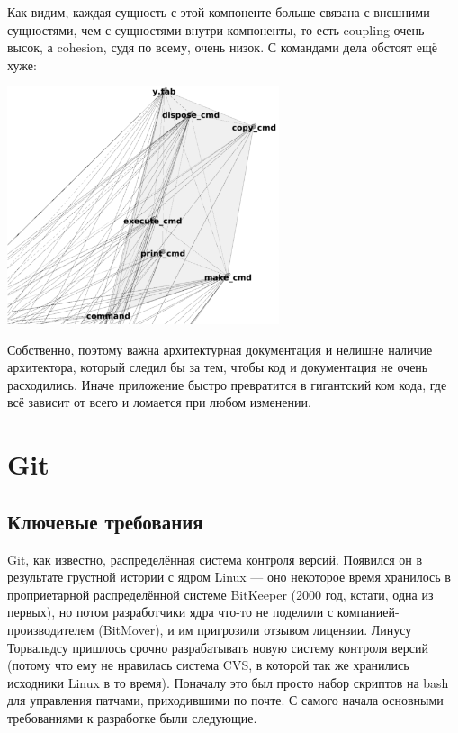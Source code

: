 \documentclass[a5paper]{article}
\begin{document}
Как видим, каждая сущность с этой компоненте больше связана с внешними сущностями, чем с сущностями внутри компоненты, то есть coupling очень высок, а cohesion, судя по всему, очень низок. С командами дела обстоят ещё хуже:

\begin{center}
    \includegraphics[width=0.6\textwidth]{bashCommands.png}
\end{center}

Собственно, поэтому важна архитектурная документация и нелишне наличие архитектора, который следил бы за тем, чтобы код и документация не очень расходились. Иначе приложение быстро превратится в гигантский ком кода, где всё зависит от всего и ломается при любом изменении.

\section{Git}

\subsection{Ключевые требования}

Git, как известно, распределённая система контроля версий. Появился он в результате грустной истории с ядром Linux --- оно некоторое время хранилось в проприетарной распределённой системе BitKeeper (2000 год, кстати, одна из первых), но потом разработчики ядра что-то не поделили с компанией-производителем (BitMover), и им пригрозили отзывом лицензии. Линусу Торвальдсу пришлось срочно разрабатывать новую систему контроля версий (потому что ему не нравилась система CVS, в которой так же хранились исходники Linux в то время). Поначалу это был просто набор скриптов на bash для управления патчами, приходившими по почте. С самого начала основными требованиями к разработке были следующие.
\end{document}
